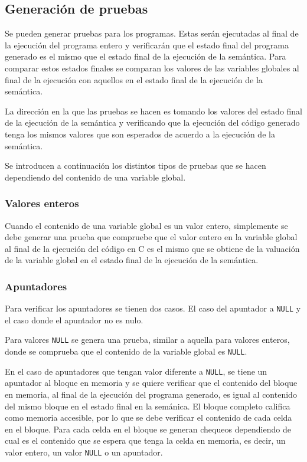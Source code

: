 \subsection{Generación de pruebas}

Se pueden generar pruebas para los programas.
Estas serán ejecutadas al final de la ejecución del programa entero y verificarán que el estado final del programa generado es el mismo que el estado final de la ejecución de la semántica.
Para comparar estos estados finales se comparan los valores de las variables globales al final de la ejecución con aquellos en el estado final de la ejecución de la semántica.

La dirección en la que las pruebas se hacen es tomando los valores del estado final de la ejecución de la semántica y verificando que la ejecución del código generado tenga los mismos valores que son esperados de acuerdo a la ejecución de la semántica.

Se introducen a continuación los distintos tipos de pruebas que se hacen dependiendo del contenido de una variable global.

\subsubsection*{Valores enteros}

Cuando el contenido de una variable global es un valor entero, simplemente se debe generar una prueba que compruebe que el valor entero en la variable global al final de la ejecución del código en C es el mismo que se obtiene de la valuación de la variable global en el estado final de la ejecución de la semántica.

\subsubsection*{Apuntadores}

Para verificar los apuntadores se tienen dos casos.
El caso del apuntador a \verb|NULL| y el caso donde el apuntador no es nulo.

Para valores \verb|NULL| se genera una prueba, similar a aquella para valores enteros, donde se comprueba que el contenido de la variable global es \verb|NULL|.

En el caso de apuntadores que tengan valor diferente a \verb|NULL|, se tiene un apuntador al bloque en memoria y se quiere verificar que el contenido del bloque en memoria, al final de la ejecución del programa generado, es igual al contenido del mismo bloque en el estado final en la semánica.
El bloque completo califica como memoria accesible, por lo que se debe verificar el contenido de cada celda en el bloque.
Para cada celda en el bloque se generan chequeos dependiendo de cual es el contenido que se espera que tenga la celda en memoria, es decir, un valor entero, un valor \verb|NULL| o un apuntador.

